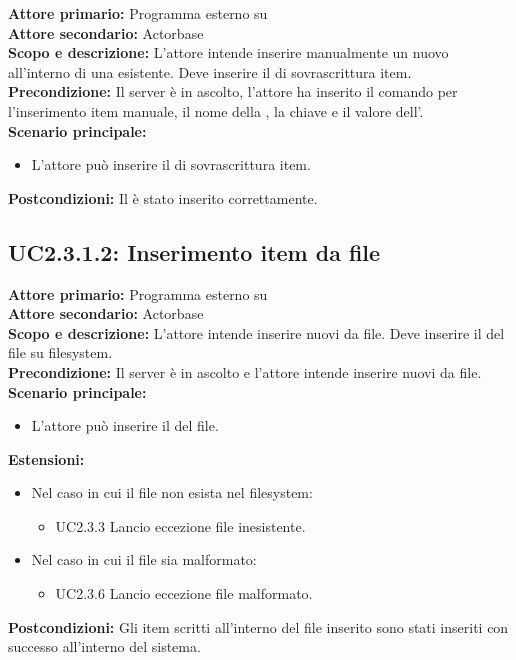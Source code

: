 \documentclass{scalatekids-article}
\begin{document}
\textbf{Attore primario:} Programma esterno su \\
\textbf{Attore secondario:} Actorbase\\
\textbf{Scopo e descrizione:} L'attore intende inserire manualmente un nuovo  all'interno di una  esistente. Deve inserire il  di sovrascrittura item.\\
\textbf{Precondizione:} Il server è in ascolto, l'attore ha inserito il comando per l'inserimento item manuale, il nome della , la chiave e il valore dell'.\\
\textbf{Scenario principale:}
\begin{itemize}
\item L'attore può inserire il  di sovrascrittura item.
\end{itemize}
\textbf{Postcondizioni:} Il  è stato inserito correttamente.

\subsection{UC2.3.1.2: Inserimento item da file}

\textbf{Attore primario:} Programma esterno su \\
\textbf{Attore secondario:} Actorbase\\
\textbf{Scopo e descrizione:} L'attore intende inserire nuovi  da file. Deve inserire il  del file su filesystem.\\
\textbf{Precondizione:} Il server è in ascolto e l'attore intende inserire nuovi  da file.\\
\textbf{Scenario principale:}
\begin{itemize}
\item L'attore può inserire il  del file.
\end{itemize}
\textbf{Estensioni:}
\begin{itemize}
\item Nel caso in cui il file non esista nel filesystem:
  \begin{itemize}
  \item UC2.3.3 Lancio eccezione file inesistente.
  \end{itemize}
\item Nel caso in cui il file sia malformato:
  \begin{itemize}
  \item UC2.3.6 Lancio eccezione file malformato.
  \end{itemize}
\end{itemize}
\textbf{Postcondizioni:} Gli item scritti all'interno del file inserito sono stati inseriti con successo all'interno del sistema.%
\end{document}
